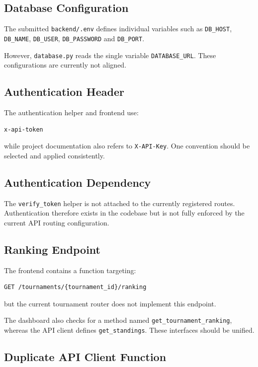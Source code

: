 \documentclass[11pt,a4paper]{article}
\begin{document}
\subsection{Database Configuration}

The submitted \texttt{backend/.env} defines individual variables such
as \texttt{DB\_HOST}, \texttt{DB\_NAME}, \texttt{DB\_USER},
\texttt{DB\_PASSWORD} and \texttt{DB\_PORT}.

However, \texttt{database.py} reads the single variable
\texttt{DATABASE\_URL}. These configurations are currently not aligned.

\subsection{Authentication Header}

The authentication helper and frontend use:

\begin{lstlisting}
x-api-token
\end{lstlisting}

while project documentation also refers to \texttt{X-API-Key}.
One convention should be selected and applied consistently.

\subsection{Authentication Dependency}

The \texttt{verify\_token} helper is not attached to the currently
registered routes. Authentication therefore exists in the codebase
but is not fully enforced by the current API routing configuration.

\subsection{Ranking Endpoint}

The frontend contains a function targeting:

\begin{lstlisting}
GET /tournaments/{tournament_id}/ranking
\end{lstlisting}

but the current tournament router does not implement this endpoint.

The dashboard also checks for a method named
\texttt{get\_tournament\_ranking}, whereas the API client defines
\texttt{get\_standings}. These interfaces should be unified.

\subsection{Duplicate API Client Function}
\end{document}
